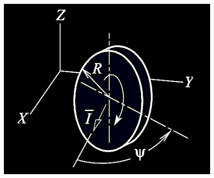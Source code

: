 \documentclass[12pt, letterpaper]{../assignment}
\begin{document}
\begin{figure}[H]
    \centering
    \includegraphics[scale=0.7,frame]{images/Q7_12.png}
\end{figure}




\end{document}
